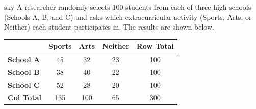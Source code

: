 \documentclass[10pt]{article}
\begin{document}
\namepartnerperiod

\vspace{0.08in}

\begin{scenariobox}{sky}
A researcher randomly selects 100 students from each of three high schools (Schools A, B, and C)
and asks which extracurricular activity (Sports, Arts, or Neither) each student participates in.
The results are shown below.

\vspace{0.08in}
\renewcommand{\arraystretch}{1.4}
\begin{tabularx}{0.82\linewidth}{l cccc}
    & \textbf{Sports} & \textbf{Arts} & \textbf{Neither} & \textbf{Row Total} \\
    \hline
    \textbf{School A} & 45 & 32 & 23 & 100 \\
    \textbf{School B} & 38 & 40 & 22 & 100 \\
    \textbf{School C} & 52 & 28 & 20 & 100 \\
    \hline
    \textbf{Col Total} & 135 & 100 & 65 & 300 \\
\end{tabularx}
\end{scenariobox}
\end{document}
